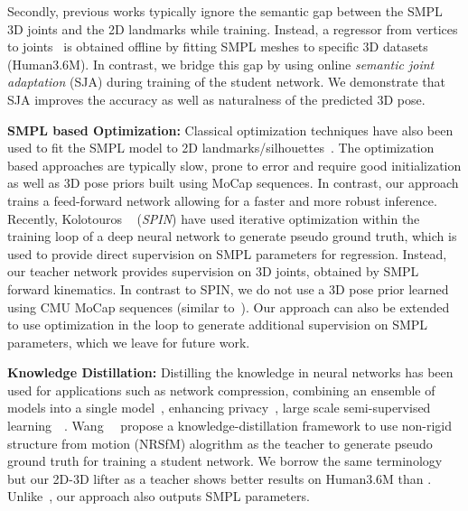 \documentclass[10pt,twocolumn,letterpaper]{article}
\begin{document}
Secondly, previous works typically ignore the semantic gap between the SMPL 3D joints and the 2D landmarks while training. Instead, a regressor from vertices to joints~\cite{arnab2019exploiting,temporal3DposeURL,kanazawa2018end} is obtained offline by fitting SMPL meshes to specific 3D datasets (\eg Human3.6M). In contrast, we bridge this gap by using online \textit{semantic joint adaptation} (SJA) during training of the student network. 
We demonstrate that SJA improves the accuracy as well as naturalness of the predicted 3D pose. 



\noindent\textbf{SMPL based Optimization:} Classical optimization techniques have also been used to fit the SMPL model to 2D landmarks/silhouettes~\cite{bogo2016keep,guler2019holopose,Lassner:UP:2017,mehta2017vnect}. The optimization based approaches are typically slow, prone to error and require good initialization as well as 3D pose priors built using MoCap sequences. In contrast, our approach trains a feed-forward network allowing for a faster and more robust inference. Recently, Kolotouros \etal~\cite{SPIN_ICCV2019} (\textit{SPIN}) have used iterative optimization within the training loop of a deep neural network to generate pseudo ground truth, which is used to provide direct supervision on SMPL parameters for regression. Instead, our teacher network provides supervision on 3D joints, obtained by SMPL forward kinematics. In contrast to SPIN, we do not use a 3D pose prior learned using CMU MoCap sequences (similar to~\cite{bogo2016keep}). Our approach can also be extended to use optimization in the loop to generate additional supervision on SMPL parameters, which we leave for future work.



\noindent\textbf{Knowledge Distillation:} Distilling the knowledge in neural networks has been used for applications such as network compression, combining an ensemble of models into a single model~\cite{hinton2015distilling}, enhancing privacy~\cite{papernot2017semisupervised}, large scale semi-supervised learning~\cite{fb_billionscale_2019}~\etc. Wang~\etal~\cite{wang2019distill} propose a knowledge-distillation framework to use non-rigid structure from motion (NRSfM) alogrithm as the teacher to generate pseudo ground truth for training a student network. We borrow the same terminology but our 2D-3D lifter as a teacher shows better results on Human3.6M than \cite{wang2019distill}. Unlike~\cite{wang2019distill}, our approach also outputs SMPL parameters.
\end{document}
